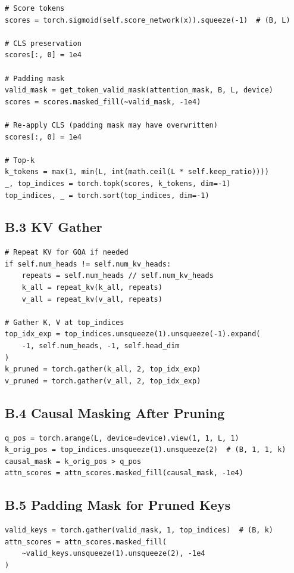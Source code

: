 \begin{lstlisting}
# Score tokens
scores = torch.sigmoid(self.score_network(x)).squeeze(-1)  # (B, L)

# CLS preservation
scores[:, 0] = 1e4

# Padding mask
valid_mask = get_token_valid_mask(attention_mask, B, L, device)
scores = scores.masked_fill(~valid_mask, -1e4)

# Re-apply CLS (padding mask may have overwritten)
scores[:, 0] = 1e4

# Top-k
k_tokens = max(1, min(L, int(math.ceil(L * self.keep_ratio))))
_, top_indices = torch.topk(scores, k_tokens, dim=-1)
top_indices, _ = torch.sort(top_indices, dim=-1)
\end{lstlisting}

\subsection{B.3 KV Gather}

\begin{lstlisting}
# Repeat KV for GQA if needed
if self.num_heads != self.num_kv_heads:
    repeats = self.num_heads // self.num_kv_heads
    k_all = repeat_kv(k_all, repeats)
    v_all = repeat_kv(v_all, repeats)

# Gather K, V at top_indices
top_idx_exp = top_indices.unsqueeze(1).unsqueeze(-1).expand(
    -1, self.num_heads, -1, self.head_dim
)
k_pruned = torch.gather(k_all, 2, top_idx_exp)
v_pruned = torch.gather(v_all, 2, top_idx_exp)
\end{lstlisting}

\subsection{B.4 Causal Masking After Pruning}

\begin{lstlisting}
q_pos = torch.arange(L, device=device).view(1, 1, L, 1)
k_orig_pos = top_indices.unsqueeze(1).unsqueeze(2)  # (B, 1, 1, k)
causal_mask = k_orig_pos > q_pos
attn_scores = attn_scores.masked_fill(causal_mask, -1e4)
\end{lstlisting}

\subsection{B.5 Padding Mask for Pruned Keys}

\begin{lstlisting}
valid_keys = torch.gather(valid_mask, 1, top_indices)  # (B, k)
attn_scores = attn_scores.masked_fill(
    ~valid_keys.unsqueeze(1).unsqueeze(2), -1e4
)
\end{lstlisting}

